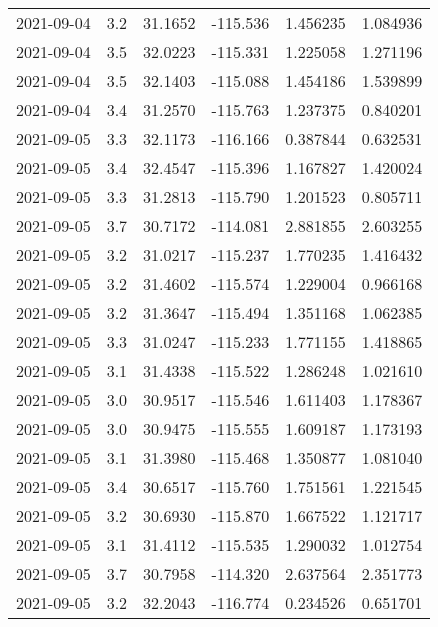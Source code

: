 \begin{tabular}{lrrrrr}
2021-09-04 &       3.2 &  31.1652 &  -115.536 &         1.456235 &         1.084936 \\
2021-09-04 &       3.5 &  32.0223 &  -115.331 &         1.225058 &         1.271196 \\
2021-09-04 &       3.5 &  32.1403 &  -115.088 &         1.454186 &         1.539899 \\
2021-09-04 &       3.4 &  31.2570 &  -115.763 &         1.237375 &         0.840201 \\
2021-09-05 &       3.3 &  32.1173 &  -116.166 &         0.387844 &         0.632531 \\
2021-09-05 &       3.4 &  32.4547 &  -115.396 &         1.167827 &         1.420024 \\
2021-09-05 &       3.3 &  31.2813 &  -115.790 &         1.201523 &         0.805711 \\
2021-09-05 &       3.7 &  30.7172 &  -114.081 &         2.881855 &         2.603255 \\
2021-09-05 &       3.2 &  31.0217 &  -115.237 &         1.770235 &         1.416432 \\
2021-09-05 &       3.2 &  31.4602 &  -115.574 &         1.229004 &         0.966168 \\
2021-09-05 &       3.2 &  31.3647 &  -115.494 &         1.351168 &         1.062385 \\
2021-09-05 &       3.3 &  31.0247 &  -115.233 &         1.771155 &         1.418865 \\
2021-09-05 &       3.1 &  31.4338 &  -115.522 &         1.286248 &         1.021610 \\
2021-09-05 &       3.0 &  30.9517 &  -115.546 &         1.611403 &         1.178367 \\
2021-09-05 &       3.0 &  30.9475 &  -115.555 &         1.609187 &         1.173193 \\
2021-09-05 &       3.1 &  31.3980 &  -115.468 &         1.350877 &         1.081040 \\
2021-09-05 &       3.4 &  30.6517 &  -115.760 &         1.751561 &         1.221545 \\
2021-09-05 &       3.2 &  30.6930 &  -115.870 &         1.667522 &         1.121717 \\
2021-09-05 &       3.1 &  31.4112 &  -115.535 &         1.290032 &         1.012754 \\
2021-09-05 &       3.7 &  30.7958 &  -114.320 &         2.637564 &         2.351773 \\
2021-09-05 &       3.2 &  32.2043 &  -116.774 &         0.234526 &         0.651701 \\

\end{tabular}
